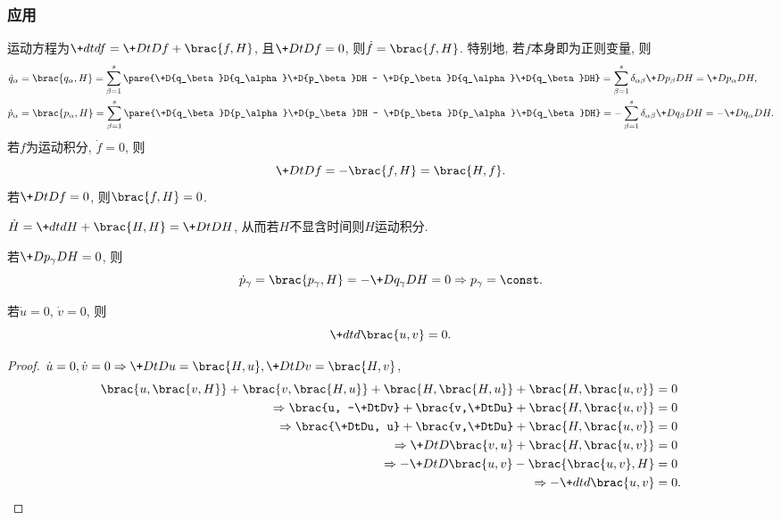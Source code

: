 \documentclass[../LectureNotes.tex]{subfiles}
\begin{document}

\subsubsection{应用} %
\label{ssub:应用}

运动方程为$\+dtdf = \+DtDf + \brac{f,H}$, 且$\displaystyle \+DtDf = 0$, 则$\dot{f} = \brac{f,H}$. 特别地, 若$f$本身即为正则变量, 则
\begin{align*}
    \dot{q}_\alpha &= \brac{q_\alpha,H} = \sum_{\beta=1}^s \pare{\+D{q_\beta}D{q_\alpha}\+D{p_\beta}DH - \+D{p_\beta}D{q_\alpha}\+D{q_\beta}DH} = \sum_{\beta=1}^s \delta_{\alpha\beta}\+D{p_\beta}DH = \+D{p_\alpha}DH, \\
    \dot{p}_\alpha &= \brac{p_\alpha,H} = \sum_{\beta=1}^s \pare{\+D{q_\beta}D{p_\alpha}\+D{p_\beta}DH - \+D{p_\beta}D{p_\alpha}\+D{q_\beta}DH} = -\sum_{\beta=1}^s \delta_{\alpha\beta}\+D{q_\beta}DH = -\+D{q_\alpha}DH.
\end{align*}
若$f$为运动积分, $\dot{f} = 0$, 则
\[ \+DtDf = -\brac{f,H} = \brac{H,f}. \]
若$\displaystyle \+DtDf = 0$, 则$\brac{f,H} = 0$.
\begin{ex}
    $\displaystyle \dot{H} = \+dtdH + \brac{H,H} = \+DtDH$, 从而若$H$不显含时间则$H$运动积分.
\end{ex}
\begin{ex}
    若$\displaystyle \+D{p_\gamma}DH = 0$, 则
    \[ \dot{p}_\gamma = \brac{p_\gamma,H} = -\+D{q_\gamma}DH = 0\Rightarrow p_\gamma = \const. \]
\end{ex}
\begin{theorem}[Poisson定理]
    若$\dot{u} = 0$, $\dot{v} = 0$, 则
    \[ \+dtd{}\brac{u,v} = 0. \]
\end{theorem}
\begin{proof}
    $\dot{u} = 0,\dot{v} = 0 \Rightarrow \displaystyle \+DtDu = \brac{H,u},\+DtDv = \brac{H,v}$,
    \begin{align*}
        \brac{u,\brac{v,H}} + \brac{v,\brac{H,u}} + \brac{H,\brac{H,u}} + \brac{H,\brac{u,v}} &= 0 \\
        \Rightarrow \brac{u, -\+DtDv} + \brac{v,\+DtDu} + \brac{H,\brac{u,v}} &= 0 \\
        \Rightarrow \brac{\+DtDu, u} + \brac{v,\+DtDu} + \brac{H,\brac{u,v}} &= 0 \\
        \Rightarrow \+DtD{}\brac{v,u} + \brac{H,\brac{u,v}} &= 0 \\
        \Rightarrow -\+DtD{}\brac{u,v} - \brac{\brac{u,v},H} &= 0 \\
        \Rightarrow -\+dtd{}\brac{u,v} &= 0. \qedhere
    \end{align*}
\end{proof}
\end{document}
